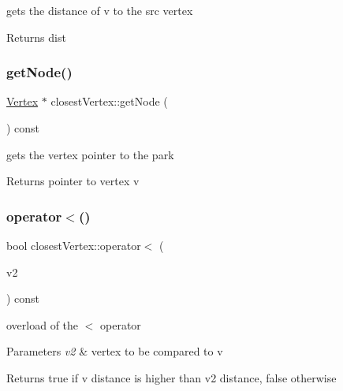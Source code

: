 gets the distance of v to the src vertex 

\begin{DoxyReturn}{Returns}
dist 
\end{DoxyReturn}
\hypertarget{classclosest_vertex_ac5f6fae3c1b289755622166f2ef700c0}{}\label{classclosest_vertex_ac5f6fae3c1b289755622166f2ef700c0} 
\subsubsection{\texorpdfstring{get\+Node()}{getNode()}}
{\footnotesize\ttfamily \hyperlink{class_vertex}{Vertex} $\ast$ closest\+Vertex\+::get\+Node (\begin{DoxyParamCaption}{ }\end{DoxyParamCaption}) const}



gets the vertex pointer to the park 

\begin{DoxyReturn}{Returns}
pointer to vertex v 
\end{DoxyReturn}
\hypertarget{classclosest_vertex_ac4d58777399d8d0fea2ab441cd00660e}{}\label{classclosest_vertex_ac4d58777399d8d0fea2ab441cd00660e} 
\subsubsection{\texorpdfstring{operator$<$()}{operator<()}}
{\footnotesize\ttfamily bool closest\+Vertex\+::operator$<$ (\begin{DoxyParamCaption}\item[{const \hyperlink{classclosest_vertex}{closest\+Vertex} \&}]{v2 }\end{DoxyParamCaption}) const}



overload of the $<$ operator 


\begin{DoxyParams}{Parameters}
{\em v2} & vertex to be compared to v\\
\hline
\end{DoxyParams}
\begin{DoxyReturn}{Returns}
true if v distance is higher than v2 distance, false otherwise 
\end{DoxyReturn}
\hypertarget{classclosest_vertex_a16d20ede3c6e2be693305fac4e0ccdea}{}\label{classclosest_vertex_a16d20ede3c6e2be693305fac4e0ccdea} 
